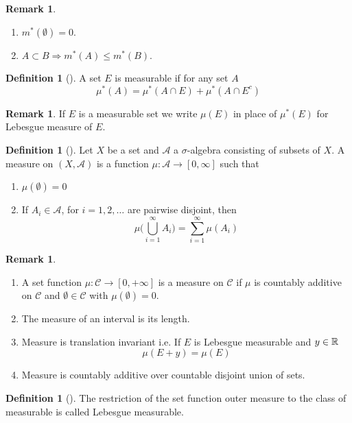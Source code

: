\documentclass[	DIV=calc,paper=a4,fontsize=11pt]{scrartcl}	 	%
\theoremstyle{definition}
\newtheorem{defn}[thm]{Definition}
\newtheorem{rem}[thm]{Remark}
\theoremstyle{plain}
\theoremstyle{remark}
\begin{document}
\begin{rem}\color{red}
\begin{enumerate}
  \item $m^*(\emptyset)=0$.
  \item $A\subset B \Rightarrow m^*(A)\leq m^*(B)$.
\end{enumerate}
\end{rem}
\begin{defn}[\textbf{\color{blue}{Measurable}}]
A set $E$ is measurable if for any set $A$
\[\mu^*(A)=\mu^*(A\cap E)+\mu^*(A\cap E^c)\]
\end{defn}
\begin{rem}\color{red}
If $E$ is a measurable set we write $\mu(E)$ in place of $\mu^*(E)$ for Lebesgue measure of $E$.
\end{rem}
\begin{defn}[\textbf{\color{blue}{Measure}}]
Let $X$ be a set and $\mathcal{A}$ a $\sigma$-algebra consisting of subsets of $X$. A measure on $(X, \mathcal{A})$ is a function $\mu : \mathcal{A} \to [0, \infty]$ such that
\begin{enumerate}
  \item $\mu(\emptyset)=0$
  \item If $A_i\in \mathcal{A}$, for $i=1,2,\ldots$ are pairwise disjoint, then
  \[\mu\biggl(\bigcup_{i=1}^{\infty}A_i\biggl)=\sum_{i=1}^{\infty}\mu(A_i)\]
\end{enumerate}
\end{defn}
\begin{rem}\color{red}
\begin{enumerate}
  \item A set function $\mu :\mathcal{C}\to [0,+\infty]$ is a measure on $\mathcal{C}$ if $\mu$ is countably additive on $\mathcal{C}$ and $\emptyset\in \mathcal{C}$ with $\mu(\emptyset)=0$.
  \item The measure of an interval is its length.
  \item Measure is translation invariant i.e. If $E$ is Lebesgue measurable and $y\in \Bbb R$ $$\mu(E+y)=\mu(E)$$
  \item Measure is countably additive over countable disjoint union of sets.
\end{enumerate}
\end{rem}

\begin{defn}[\textbf{\color{blue}{Lebesgue Measurable}}]
The restriction of the set function outer measure to the class of measurable is called Lebesgue measurable.
\end{defn}
\end{document}
